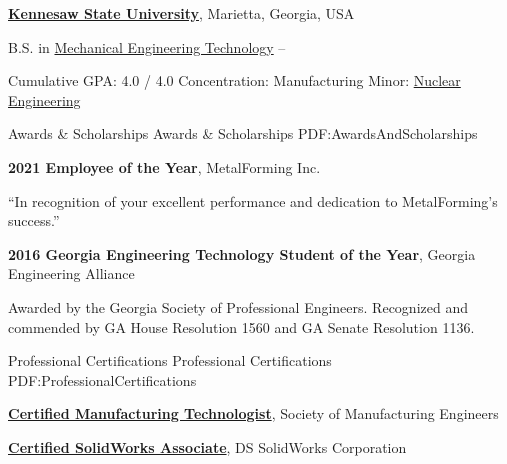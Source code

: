 \documentclass[
letterpaper,
MMMyyyy,
nonstopmode,
draftmode,
]{resume}
\begin{document}
\begin{Body}
\Entry
\href{http://www.kennesaw.edu/}
{\textbf{Kennesaw State University}},
Marietta, Georgia, USA

\Gap
\BulletItem
B.S. in
\href{http://engineering.kennesaw.edu/engineering-technology/}
{Mechanical Engineering Technology}
\hfill
{} --
\begin{Detail}
\SubBulletItem
Cumulative GPA: 4.0 / 4.0
\SubBulletItem
Concentration: Manufacturing
\SubBulletItem
Minor:
\href{http://engineering.kennesaw.edu/nuclear-studies/}
{Nuclear Engineering}
\end{Detail}



\Section
{Awards \&\newline
Scholarships}
{Awards \& Scholarships}
{PDF:AwardsAndScholarships}

\textbf{2021 Employee of the Year},
MetalForming Inc.
\begin{Detail}
\SubBulletItem
“In recognition of your excellent performance and dedication to MetalForming’s success.”
\end{Detail}

\Gap

\textbf{2016 Georgia Engineering Technology Student of the Year},
Georgia Engineering Alliance
\begin{Detail}
\SubBulletItem
Awarded by the Georgia Society of Professional Engineers.
\SubBulletItem
Recognized and commended by GA House Resolution 1560 and GA Senate Resolution 1136.
\end{Detail}

\Gap


\Section
{Professional Certifications}
{Professional Certifications}
{PDF:ProfessionalCertifications}

\textbf{\href{http://www.sme.org/cmfgt/}
{Certified Manufacturing Technologist}},
Society of Manufacturing Engineers

\textbf{\href{http://www.solidworks.com/sw/support/mcad-certification-programs.htm}
{Certified SolidWorks Associate}},
DS SolidWorks Corporation




\end{Body}
\end{document}
